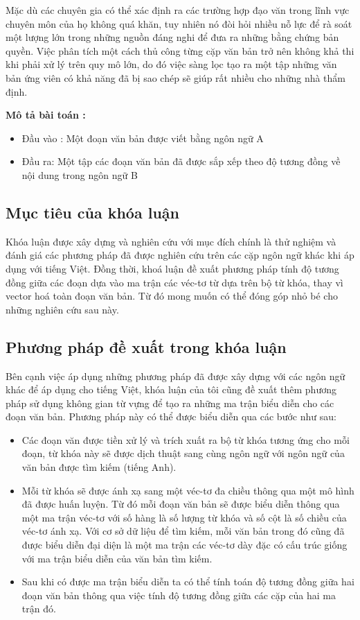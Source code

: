 \documentclass[12pt]{report}
\begin{document}
Mặc dù các chuyên gia có thể xác định ra các trường hợp đạo văn trong lĩnh vực chuyên môn của họ không quá khăn, tuy nhiên nó đòi hỏi nhiều nỗ lực để rà soát một lượng lớn trong những nguồn đáng nghi để đưa ra những bằng chứng bản quyền. Việc phân tích một cách thủ công từng cặp văn bản trở nên không khả thi khi phải xử lý trên quy mô lớn, do đó việc sàng lọc tạo ra một tập những văn bản ứng viên có khả năng đã bị sao chép sẽ giúp rất nhiều cho những nhà thẩm định.


\textbf{Mô tả bài toán :}
\begin{itemize}
	\item Đầu vào : Một đoạn văn bản được viết bằng ngôn ngữ A
	\item Đầu ra: Một tập các đoạn văn bản đã được sắp xếp theo độ tương đồng về nội dung trong ngôn ngữ B 
\end{itemize}

\subsection{Mục tiêu của khóa luận}

Khóa luận được xây dựng và nghiên cứu với mục đích chính là thử nghiệm và đánh giá các phương pháp đã được nghiên cứu trên các cặp ngôn ngữ khác khi áp dụng với tiếng Việt. Đồng thời, khoá luận đề xuất phương pháp tính độ tương đồng giữa các đoạn dựa vào ma trận các véc-tơ từ dựa trên bộ từ khóa, thay vì vector hoá toàn đoạn văn bản. Từ đó mong muốn có thể đóng góp nhỏ bé cho những nghiên cứu sau này.

\subsection{Phương pháp đề xuất trong khóa luận}
Bên cạnh việc áp dụng những phương pháp đã được xây dựng với các ngôn ngữ khác để áp dụng cho tiếng Việt, khóa luận của tôi cũng đề xuất thêm phương pháp sử dụng không gian từ vựng để tạo ra những ma trận biểu diễn cho các đoạn văn bản. Phương pháp này có thể được biểu diễn qua các bước như sau:
\begin{itemize}
	\item Các đoạn văn được tiền xử lý và trích xuất ra bộ từ khóa tương ứng cho mỗi đoạn, từ khóa này sẽ được dịch thuật sang cùng ngôn ngữ với ngôn ngữ của văn bản được tìm kiếm (tiếng Anh).
	\item Mỗi từ khóa sẽ được ánh xạ sang một véc-tơ đa chiều thông qua một mô hình đã được huấn luyện. Từ đó mỗi đoạn văn bản sẽ được biểu diễn thông qua một ma trận véc-tơ với số hàng là số  lượng từ khóa và số cột là số chiều của véc-tơ ánh xạ. Với cơ sở dữ liệu để tìm kiếm, mỗi văn bản trong đó cũng đã được biểu diễn đại diện là một ma trận các véc-tơ dày đặc có cấu trúc giống với ma trận biểu diễn của văn bản tìm kiếm.
	\item Sau khi có được ma trận biểu diễn ta có thể tính toán độ tương đồng giữa hai đoạn văn bản thông qua việc tính độ tương  đồng giữa các cặp của hai ma trận đó.
\end{itemize}
\end{document}
